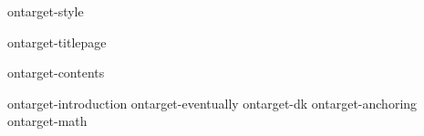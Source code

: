 
\environment ontarget-style

\dontcomplain

\startdocument

    \component ontarget-titlepage

    \startfrontmatter
        \component ontarget-contents
    \stopfrontmatter

    \startbodymatter
        \component ontarget-introduction
        \component ontarget-eventually
        \component ontarget-dk
        \component ontarget-anchoring
        \component ontarget-math
    \stopbodymatter

\stopdocument
